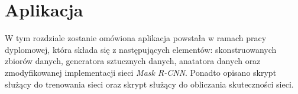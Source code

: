 \chapter{Aplikacja}
\label{sec:aplikacja}
W tym rozdziale zostanie omówiona aplikacja powstała w ramach pracy dyplomowej, która składa się z następujących elementów: skonstruowanych zbiorów danych, generatora sztucznych danych, anatatora danych oraz zmodyfikowanej implementacji sieci \textit{Mask R-CNN}.
Ponadto opisano skrypt służący do trenowania sieci oraz skrypt służący do obliczania skuteczności sieci.
